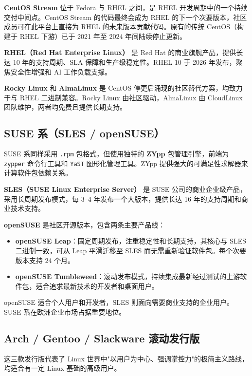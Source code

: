 \documentclass[12pt,UTF8]{ctexbook}
\begin{document}
\textbf{CentOS Stream} 位于 Fedora 与 RHEL 之间，是 RHEL 开发周期中的一个持续交付中间点。CentOS Stream 的代码最终会成为 RHEL 的下一个次要版本，社区成员可在此平台上直接为 RHEL 的未来版本贡献代码。原有的传统 CentOS（构建于 RHEL 下游）已于 2021 年至 2024 年间陆续停止更新。

\textbf{RHEL（Red Hat Enterprise Linux）} 是 Red Hat 的商业旗舰产品，提供长达 10 年的支持周期、SLA 保障和生产级稳定性。RHEL 10 于 2026 年发布，聚焦安全性增强和 AI 工作负载支撑。

\textbf{Rocky Linux} 和 \textbf{AlmaLinux} 是 CentOS 停更后涌现的社区替代方案，均致力于与 RHEL 二进制兼容。Rocky Linux 由社区驱动，AlmaLinux 由 CloudLinux 团队维护，两者均免费且提供长期支持。

\subsection{SUSE 系（SLES / openSUSE）}

SUSE 系同样采用 \texttt{.rpm} 包格式，但使用独特的 \textbf{ZYpp} 包管理引擎，前端为 \texttt{zypper} 命令行工具和 \texttt{YaST} 图形化管理工具。ZYpp 提供强大的可满足性求解器来计算软件包依赖关系。
	
\textbf{SLES（SUSE Linux Enterprise Server）} 是 SUSE 公司的商业企业级产品，采用长周期发布模式，每 3--4 年发布一个大版本，提供长达 16 年的支持周期和商业技术支持。
	
\textbf{openSUSE} 是社区开源版本，包含两条主要产品线：

\begin{itemize}
	\item \textbf{openSUSE Leap}：固定周期发布，注重稳定性和长期支持，其核心与 SLES 二进制一致，可从 Leap 平滑迁移至 SLES 而无需重新验证软件包。每个次要版本支持 24 个月。
	\item \textbf{openSUSE Tumbleweed}：滚动发布模式，持续集成最新经过测试的上游软件包，适合追求最新技术的开发者和桌面用户。
\end{itemize}
	
openSUSE 适合个人用户和开发者，SLES 则面向需要商业支持的企业用户。SUSE 系在欧洲企业市场占据重要地位。
	
\subsection{Arch / Gentoo / Slackware 滚动发行版}
	
这三款发行版代表了 Linux 世界中"以用户为中心、强调掌控力"的极简主义路线，均适合有一定 Linux 基础的高级用户。
	
\end{document}
